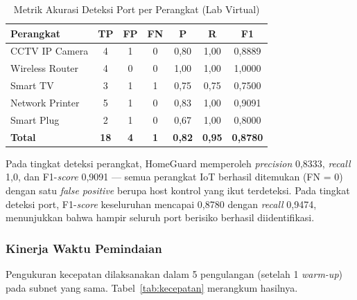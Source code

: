 \documentclass[conference]{IEEEtran}
\begin{document}
\begin{table}[htbp]
\caption{Metrik Akurasi Deteksi Port per Perangkat (Lab Virtual)}
\label{tab:metrik_deteksi}
\renewcommand{\arraystretch}{1.2}
\begin{tabular}{|l|c|c|c|c|c|c|}
\hline
\textbf{Perangkat} & \textbf{TP} & \textbf{FP} & \textbf{FN} & \textbf{P} & \textbf{R} & \textbf{F1} \\
\hline
CCTV IP Camera   & 4 & 1 & 0 & 0,80 & 1,00 & 0,8889 \\
\hline
Wireless Router  & 4 & 0 & 0 & 1,00 & 1,00 & 1,0000 \\
\hline
Smart TV         & 3 & 1 & 1 & 0,75 & 0,75 & 0,7500 \\
\hline
Network Printer  & 5 & 1 & 0 & 0,83 & 1,00 & 0,9091 \\
\hline
Smart Plug       & 2 & 1 & 0 & 0,67 & 1,00 & 0,8000 \\
\hline
\textbf{Total}   & \textbf{18} & \textbf{4} & \textbf{1} & \textbf{0,82} & \textbf{0,95} & \textbf{0,8780} \\
\hline
\end{tabular}
\end{table}

Pada tingkat deteksi perangkat, HomeGuard memperoleh \textit{precision} 0,8333, \textit{recall} 1,0, dan F1-\textit{score} 0,9091 --- semua perangkat IoT berhasil ditemukan (FN = 0) dengan satu \textit{false positive} berupa host kontrol yang ikut terdeteksi. Pada tingkat deteksi port, F1-\textit{score} keseluruhan mencapai 0,8780 dengan \textit{recall} 0,9474, menunjukkan bahwa hampir seluruh port berisiko berhasil diidentifikasi.

\subsubsection{Kinerja Waktu Pemindaian}

Pengukuran kecepatan dilaksanakan dalam 5 pengulangan (setelah 1 \textit{warm-up}) pada subnet yang sama. Tabel\ \ref{tab:kecepatan} merangkum hasilnya.
\end{document}
